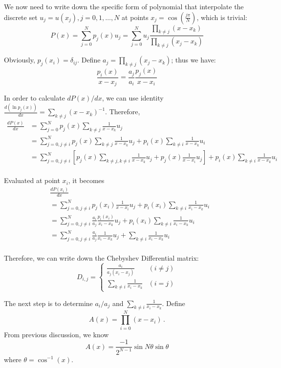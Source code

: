   We now need to write down the specific form of polynomial that interpolate the discrete set
  $u_{j}=u(x_j),j=0,1,\dots,N$ at points $x_{j}=\cos(\frac{j\pi}{N})$, which is trivial:
  \begin{equation}
   P(x)=\sum_{j=0}^{N}p_{j}(x)u_{j}=\sum_{j=0}^{N}u_{j}\frac{\prod_{k\neq j}(x-x_{k})}{\prod_{k\neq j}(x_{j}-x_{k})}
  \end{equation}

  Obviously, $p_{j}(x_{i})=\delta_{ij}$. Define $a_{j}=\prod_{k\neq j}(x_{j}-x_{k})$; thus we have:
  \[
   \frac{p_{i}(x)}{x-x_{j}}=\frac{a_j}{a_i} \frac{p_{j}(x)}{x-x_{i}}
  \]

  In order to calculate $dP(x)/dx$, we can use
  identity $\frac{d(\ln p_{j}(x))}{dx}=\sum_{k\neq j}(x-x_{k})^{-1}$. Therefore,
  \begin{align*}
   \frac{dP(x)}{dx} &= \sum_{j=0}^{N}p_{j}(x)\sum_{k\neq j}\frac{1}{x-x_{k}}u_{j}\\
   &=  \sum_{j=0,j\neq i}^{N}p_{j}(x)\sum_{k\neq j}\frac{1}{x-x_{k}}u_{j}+
   p_{i}(x)\sum_{k\neq i}\frac{1}{x-x_{k}}u_{i}\\
   &=  \sum_{j=0,j\neq i}^{N}[p_{j}(x)\sum_{k\neq j,k\neq i}\frac{1}{x-x_{k}}u_{j}+
   p_{j}(x)\frac{1}{x-x_{i}}u_{j}]+p_{i}(x)\sum_{k\neq i}\frac{1}{x-x_{k}}u_{i}\\
  \end{align*}

  Evaluated at point $x_{i}$, it becomes
  \begin{align*}
   & \frac{dP(x_{i})}{dx}\\
   & =\sum_{j=0,j\neq i}^{N} p_{j}(x_{i})\frac{1}{x-x_{i}}u_{j}
   +p_{i}(x_{i})\sum_{k\neq i}\frac{1}{x_{i}-x_{k}}u_{i}\\
   & =\sum_{j=0,j\neq i}^{N}\frac{a_i}{a_j}\frac{p_{i}(x_{i})}{x_{i}-x_{k}}u_{j}
   +p_{i}(x_{i})\sum_{k\neq i}\frac{1}{x_{i}-x_{k}}u_{i}\\
   & =\sum_{j=0,j\neq i}^{N}\frac{a_i}{a_j}\frac{1}{x_{i}-x_{k}}u_{j}
   +\sum_{k\neq i}\frac{1}{x_{i}-x_{k}}u_{i}\\
  \end{align*}

  Therefore, we can write down the Chebyshev Differential matrix:
  \[
   D_{i,j}=
   \begin{cases}
    \frac{a_{i}}{a_{j}(x_{i}-x_{j})} & (i\neq j)\\
    \sum_{k\neq i}\frac{1}{x_{i}-x_{k}} & (i=j)
   \end{cases}
  \]

  The next step is to determine $a_{i}/a_{j}$ and $\sum_{k\neq i}\frac{1}{x_{i}-x_{k}}$. Define
  \[A(x)=\prod_{i=0}^{N}(x-x_{i})
  \,.
  \] From previous discussion, we know
  \[
   A(x)=\frac{-1}{2^{N-1}}\sin N\theta\sin\theta
  \]
  where $\theta=\cos^{-1}(x)$.

